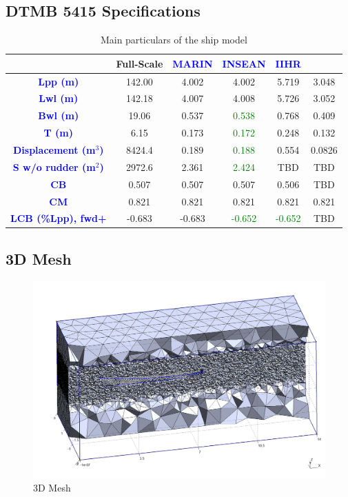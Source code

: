 \documentclass[12pt]{article} %
\begin{document}
\subsection{DTMB 5415 Specifications}
\begin{table}[h!]
    \centering
    \begin{tabular}{|c|c|c|c|c|c|}
        \hline
        & \textbf{Full-Scale} & \textbf{\textcolor{blue}{MARIN}} & \textbf{\textcolor{blue}{INSEAN}} & \textbf{\textcolor{blue}{IIHR}} &\\ \hline
        \textbf{\textcolor{blue}{Lpp (m)}} & 142.00 & 4.002 & 4.002 & 5.719 & 3.048 \\ \hline
        \textbf{\textcolor{blue}{Lwl (m)}} & 142.18 & 4.007 & 4.008 & 5.726 & 3.052 \\ \hline
        \textbf{\textcolor{blue}{Bwl (m)}} & 19.06 & 0.537 & \textcolor{green}{0.538} & 0.768 & 0.409 \\ \hline
        \textbf{\textcolor{blue}{T (m)}} & 6.15 & 0.173 & \textcolor{green}{0.172} & 0.248 & 0.132 \\ \hline
        \textbf{\textcolor{blue}{Displacement (m\(^3\))}} & 8424.4 & 0.189 & \textcolor{green}{0.188} & 0.554 & 0.0826 \\ \hline
        \textbf{\textcolor{blue}{S w/o rudder (m\(^2\))}} & 2972.6 & 2.361 & \textcolor{green}{2.424} & TBD & TBD \\ \hline
        \textbf{\textcolor{blue}{CB}} & 0.507 & 0.507 & 0.507 & 0.506 & TBD \\ \hline
        \textbf{\textcolor{blue}{CM}} & 0.821 & 0.821 & 0.821 & 0.821 & 0.821 \\ \hline
        \textbf{\textcolor{blue}{LCB (\%Lpp), fwd+}} & -0.683 & -0.683 & \textcolor{green}{-0.652} & \textcolor{green}{-0.652} & TBD \\ \hline
    \end{tabular}
    \caption{Main particulars of the ship model}
\end{table}
\subsection{3D Mesh}
\begin{figure}[ht]
    \centering
    \includegraphics[width=1\textwidth]{Mesh_3D.png}
    \caption{3D Mesh}
\end{figure}
\end{document}

